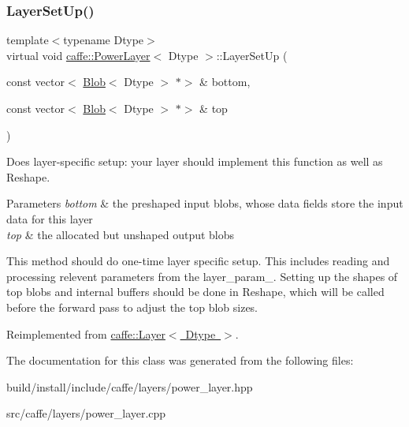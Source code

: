 \subsubsection{\texorpdfstring{Layer\+Set\+Up()}{LayerSetUp()}\hspace{0.1cm}{\footnotesize\ttfamily [2/2]}}
{\footnotesize\ttfamily template$<$typename Dtype$>$ \\
virtual void \mbox{\hyperlink{classcaffe_1_1_power_layer}{caffe\+::\+Power\+Layer}}$<$ Dtype $>$\+::Layer\+Set\+Up (\begin{DoxyParamCaption}\item[{const vector$<$ \mbox{\hyperlink{classcaffe_1_1_blob}{Blob}}$<$ Dtype $>$ $\ast$$>$ \&}]{bottom,  }\item[{const vector$<$ \mbox{\hyperlink{classcaffe_1_1_blob}{Blob}}$<$ Dtype $>$ $\ast$$>$ \&}]{top }\end{DoxyParamCaption})\hspace{0.3cm}{\ttfamily [virtual]}}



Does layer-\/specific setup\+: your layer should implement this function as well as Reshape. 


\begin{DoxyParams}{Parameters}
{\em bottom} & the preshaped input blobs, whose data fields store the input data for this layer \\
\hline
{\em top} & the allocated but unshaped output blobs\\
\hline
\end{DoxyParams}
This method should do one-\/time layer specific setup. This includes reading and processing relevent parameters from the {\ttfamily layer\+\_\+param\+\_\+}. Setting up the shapes of top blobs and internal buffers should be done in {\ttfamily Reshape}, which will be called before the forward pass to adjust the top blob sizes. 

Reimplemented from \mbox{\hyperlink{classcaffe_1_1_layer_a481323a3e0972c682787f2137468c29f}{caffe\+::\+Layer$<$ Dtype $>$}}.



The documentation for this class was generated from the following files\+:\begin{DoxyCompactItemize}
\item 
build/install/include/caffe/layers/power\+\_\+layer.\+hpp\item 
src/caffe/layers/power\+\_\+layer.\+cpp\end{DoxyCompactItemize}
